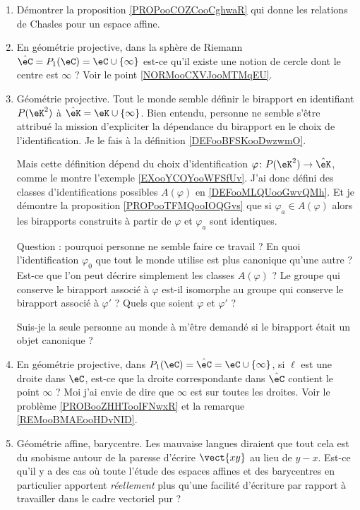 \begin{enumerate}
    \item
        Démontrer la proposition \ref{PROPooCOZCooCghwaR} qui donne les relations de Chasles pour un espace affine.
    \item
        En géométrie projective, dans la sphère de Riemann \( \hat\eC=P_1(\eC)=\eC\cup\{ \infty \}\) est-ce qu'il existe une notion de cercle dont le centre est \( \infty\) ? Voir le point \ref{NORMooCXVJooMTMqEU}.
    \item
        Géométrie projective. Tout le monde semble définir le birapport en identifiant \( P(\eK^2)\) à \( \hat\eK=\eK\cup\{ \infty \}\). Bien entendu, personne ne semble s'être attribué la mission d'expliciter la dépendance du birapport en le choix de l'identification. Je le fais à la définition \ref{DEFooBFSKooDwzwmO}.

        Mais cette définition dépend du choix d'identification \( \varphi\colon P(\eK^2)\to \hat\eK\), comme le montre l'exemple \ref{EXooYCOYooWFSfUv}. J'ai donc défini des classes d'identifications possibles \( A(\varphi)\) en \ref{DEFooMLQUooGwvQMh}. Et je démontre la proposition \ref{PROPooTFMQooIOQGvs} que si \( \varphi_a\in A(\varphi)\) alors les birapports construits à partir de \( \varphi\) et \( \varphi_a\) sont identiques.

        Question : pourquoi personne ne semble faire ce travail ? En quoi l'identification \( \varphi_0\) que tout le monde utilise est plus canonique qu'une autre ? Est-ce que l'on peut décrire simplement les classes \( A(\varphi)\) ? Le groupe qui conserve le birapport associé à \( \varphi\) est-il isomorphe au groupe qui conserve le birapport associé à \( \varphi'\) ? Quels que soient \( \varphi\) et \( \varphi'\) ?

        Suis-je la seule personne au monde à m'être demandé si le birapport était un objet canonique ?
    \item
        En géométrie projective, dans \( P_1(\eC)=\hat\eC=\eC\cup\{ \infty \}\), si \( \ell\) est une droite dans \( \eC\), est-ce que la droite correspondante dans \( \hat\eC\) contient le point \( \infty\) ? Moi j'ai envie de dire que \( \infty\) est sur toutes les droites. Voir le problème \ref{PROBooZHHTooIFNwxR} et la remarque \ref{REMooBMAEooHDvNID}.

    \item
        Géométrie affine, barycentre. Les mauvaise langues diraient que tout cela est du snobisme autour de la paresse d'écrire \( \vect{ xy }\) au lieu de \( y-x\). Est-ce qu'il y a des cas où toute l'étude des espaces affines et des barycentres en particulier apportent \emph{réellement} plus qu'une facilité d'écriture par rapport à travailler dans le cadre vectoriel pur ?
\end{enumerate}


